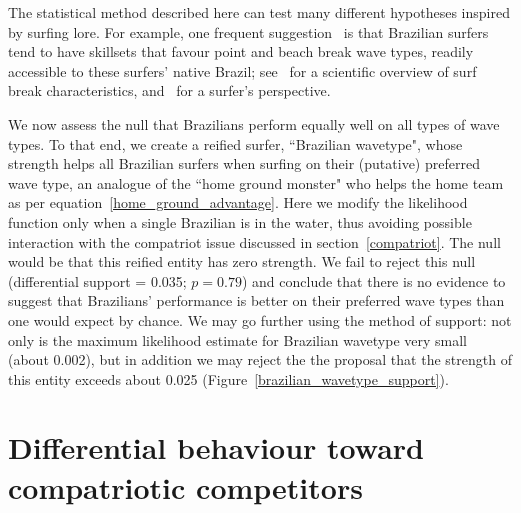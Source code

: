 \documentclass{article}
\begin{document}
The statistical method described here can test many different
hypotheses inspired by surfing lore.  For example, one frequent
suggestion~\citep{burgess2020,ho2021} is that Brazilian surfers tend to
have skillsets that favour point and beach break wave types, readily
accessible to these surfers' native Brazil; see~\citet{scarfe2003} for
a scientific overview of surf break characteristics,
and~\citet{butt2004} for a surfer's perspective.

We now assess the null that Brazilians perform equally well on all
types of wave types.  To that end, we create a reified surfer,
``Brazilian wavetype", whose strength helps all Brazilian surfers
when surfing on their (putative) preferred wave type, an analogue of
the ``home ground monster" who helps the home team as per
equation~\ref{home_ground_advantage}.  Here we modify the likelihood
function only when a single Brazilian is in the water, thus avoiding
possible interaction with the compatriot issue discussed in
section~\ref{compatriot}.  The null would be that this reified entity
has zero strength.  We fail to reject this null (differential support
= 0.035; $p=0.79$) and conclude that there is no evidence to suggest
that Brazilians' performance is better on their preferred wave types
than one would expect by chance.  We may go further using the method
of support: not only is the maximum likelihood estimate for Brazilian
wavetype very small (about 0.002), but in addition we may reject the
the proposal that the strength of this entity exceeds about 0.025
(Figure~\ref{brazilian_wavetype_support}).

\section{Differential \label{compatriot} behaviour toward compatriotic competitors}
\end{document}
